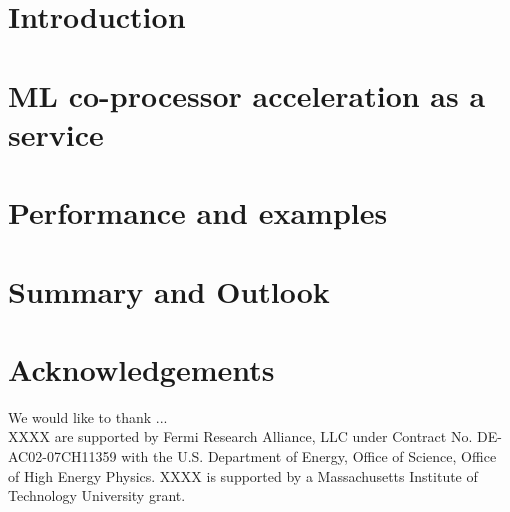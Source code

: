 \documentclass[11pt,letterpaper]{article}
\begin{document}
\section{Introduction}
\label{sec:introduction}

\section{ML co-processor acceleration as a service}
\label{sec:sonic}

\section{Performance and examples}
\label{sec:results}



\section{Summary and Outlook}
\label{sec:outlook}

\section*{Acknowledgements}
\label{sec:acknowledgements}

We would like to thank ... \\
XXXX are supported by Fermi Research Alliance, LLC under Contract No. DE-AC02-07CH11359 with the U.S. Department of Energy, Office of Science, Office of High Energy Physics.
XXXX is supported by a Massachusetts Institute of Technology University grant. 



\end{document}
